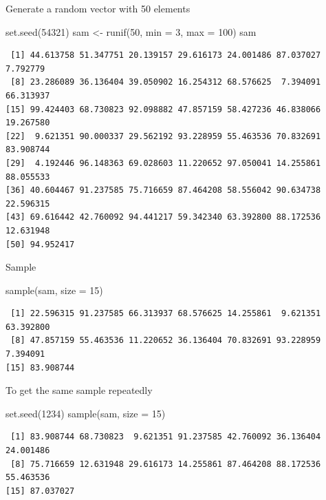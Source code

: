 \documentclass[
  letterpaper,
  DIV=11,
  numbers=noendperiod]{scrreprt}
\newenvironment{Shaded}{\begin{snugshade}}{\end{snugshade}}
\newcommand{\AttributeTok}[1]{\textcolor[rgb]{0.40,0.45,0.13}{#1}}
\newcommand{\DecValTok}[1]{\textcolor[rgb]{0.68,0.00,0.00}{#1}}
\newcommand{\FunctionTok}[1]{\textcolor[rgb]{0.28,0.35,0.67}{#1}}
\newcommand{\NormalTok}[1]{\textcolor[rgb]{0.00,0.23,0.31}{#1}}
\newcommand{\OtherTok}[1]{\textcolor[rgb]{0.00,0.23,0.31}{#1}}
\begin{document}
Generate a random vector with 50 elements

\begin{Shaded}
\begin{Highlighting}[]
\FunctionTok{set.seed}\NormalTok{(}\DecValTok{54321}\NormalTok{)}
\NormalTok{sam }\OtherTok{\textless{}{-}} \FunctionTok{runif}\NormalTok{(}\DecValTok{50}\NormalTok{, }\AttributeTok{min =} \DecValTok{3}\NormalTok{, }\AttributeTok{max =} \DecValTok{100}\NormalTok{)}
\NormalTok{sam}
\end{Highlighting}
\end{Shaded}

\begin{verbatim}
 [1] 44.613758 51.347751 20.139157 29.616173 24.001486 87.037027  7.792779
 [8] 23.286089 36.136404 39.050902 16.254312 68.576625  7.394091 66.313937
[15] 99.424403 68.730823 92.098882 47.857159 58.427236 46.838066 19.267580
[22]  9.621351 90.000337 29.562192 93.228959 55.463536 70.832691 83.908744
[29]  4.192446 96.148363 69.028603 11.220652 97.050041 14.255861 88.055533
[36] 40.604467 91.237585 75.716659 87.464208 58.556042 90.634738 22.596315
[43] 69.616442 42.760092 94.441217 59.342340 63.392800 88.172536 12.631948
[50] 94.952417
\end{verbatim}

Sample

\begin{Shaded}
\begin{Highlighting}[]
\FunctionTok{sample}\NormalTok{(sam, }\AttributeTok{size =} \DecValTok{15}\NormalTok{)}
\end{Highlighting}
\end{Shaded}

\begin{verbatim}
 [1] 22.596315 91.237585 66.313937 68.576625 14.255861  9.621351 63.392800
 [8] 47.857159 55.463536 11.220652 36.136404 70.832691 93.228959  7.394091
[15] 83.908744
\end{verbatim}

To get the same sample repeatedly

\begin{Shaded}
\begin{Highlighting}[]
\FunctionTok{set.seed}\NormalTok{(}\DecValTok{1234}\NormalTok{)}
\FunctionTok{sample}\NormalTok{(sam, }\AttributeTok{size =} \DecValTok{15}\NormalTok{)}
\end{Highlighting}
\end{Shaded}

\begin{verbatim}
 [1] 83.908744 68.730823  9.621351 91.237585 42.760092 36.136404 24.001486
 [8] 75.716659 12.631948 29.616173 14.255861 87.464208 88.172536 55.463536
[15] 87.037027
\end{verbatim}
\end{document}
